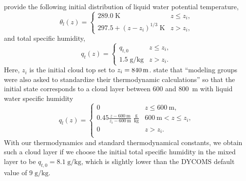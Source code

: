 \documentclass{article}
\begin{document}
{\cite{Stevens05a} provide the following initial distribution of liquid water potential temperature,
\begin{equation}\label{eq:dycoms1}
\theta_l(z) = 
    \begin{cases}
    289.0\;\mathrm{K} & z\leq z_i,\\
    297.5 + (z - z_i)^{1/3}\;\mathrm{K}& z > z_i,
    \end{cases}
\end{equation}
and total specific humidity, 
\begin{equation}\label{eq:dycoms2}
q_t(z) = 
    \begin{cases}
    q_{t,0} & z\leq z_i,\\
    1.5\;\mathrm{g/kg} & z > z_i.
    \end{cases}
\end{equation}
Here, $z_i$ is the initial cloud top set to $z_i=840\,{\rm m}$. \cite{Stevens05a} state that ``modeling groups were also asked to standardize their thermodynamic calculations'' so that the initial state corresponds to a cloud layer between 600 and 800~m with liquid water specific humidity
\begin{equation}\label{eq:dycoms2}
q_l(z) = 
    \begin{cases}
    0 & z\leq 600~\mathrm{m},\\
    0.45\frac{{}z - 600~\mathrm{m}}{z_i - 600~\mathrm{m}}\;\mathrm{\frac{g}{kg}}   & 600~\mathrm{m} < z \leq z_i,\\
    0 & z > z_i.\\
    \end{cases}
\end{equation}
With our thermodynamics and standard thermodynamical constants, we obtain such a cloud layer if we choose the initial total specific humidity in the mixed layer to be $q_{t,0} = 8.1\;\mathrm{g/kg}$, which is slightly lower than the DYCOMS default value of $9\;\mathrm{g/kg}$.

}
\end{document}
